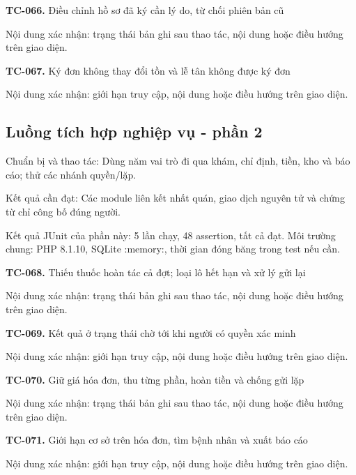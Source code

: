 \noindent\textbf{TC-066.} Điều chỉnh hồ sơ đã ký cần lý do, từ chối phiên bản cũ\par
Nội dung xác nhận:\allowbreak{} trạng thái bản ghi sau thao tác, nội dung hoặc điều hướng trên giao diện.\allowbreak{}

\noindent\textbf{TC-067.} Ký đơn không thay đổi tồn và lễ tân không được ký đơn\par
Nội dung xác nhận:\allowbreak{} giới hạn truy cập, nội dung hoặc điều hướng trên giao diện.\allowbreak{}


\par\vspace{8pt}

\subsection{Luồng tích hợp nghiệp vụ - phần 2}
Chuẩn bị và thao tác:\allowbreak{} Dùng năm vai trò đi qua khám, chỉ định, tiền, kho và báo cáo; thử các nhánh quyền/\allowbreak{}lặp.\allowbreak{}

Kết quả cần đạt:\allowbreak{} Các module liên kết nhất quán, giao dịch nguyên tử và chứng từ chỉ công bố đúng người.\allowbreak{}

Kết quả JUnit của phần này:\allowbreak{} 5 lần chạy, 48 assertion, tất cả đạt.\allowbreak{} Môi trường chung:\allowbreak{} PHP 8.\allowbreak{}1.\allowbreak{}10, SQLite :\allowbreak{}memory:\allowbreak{}, thời gian đóng băng trong test nếu cần.\allowbreak{}

\noindent\textbf{TC-068.} Thiếu thuốc hoàn tác cả đợt; loại lô hết hạn và xử lý gửi lại\par
Nội dung xác nhận:\allowbreak{} trạng thái bản ghi sau thao tác, nội dung hoặc điều hướng trên giao diện.\allowbreak{}

\noindent\textbf{TC-069.} Kết quả ở trạng thái chờ tới khi người có quyền xác minh\par
Nội dung xác nhận:\allowbreak{} giới hạn truy cập, nội dung hoặc điều hướng trên giao diện.\allowbreak{}

\noindent\textbf{TC-070.} Giữ giá hóa đơn, thu từng phần, hoàn tiền và chống gửi lặp\par
Nội dung xác nhận:\allowbreak{} trạng thái bản ghi sau thao tác, nội dung hoặc điều hướng trên giao diện.\allowbreak{}

\noindent\textbf{TC-071.} Giới hạn cơ sở trên hóa đơn, tìm bệnh nhân và xuất báo cáo\par
Nội dung xác nhận:\allowbreak{} giới hạn truy cập, nội dung hoặc điều hướng trên giao diện.\allowbreak{}

